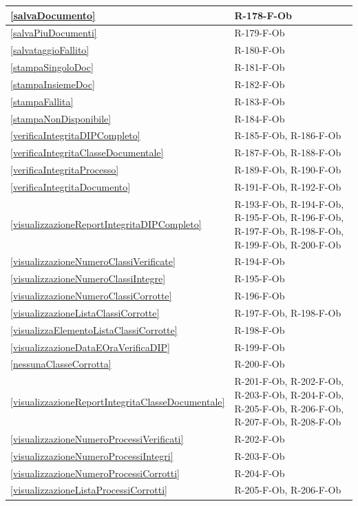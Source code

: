 \begin{longtable}{|p{4cm}|p{10cm}|}
\hline
\ref{salvaDocumento} & R-178-F-Ob \\
\hline
\ref{salvaPiuDocumenti} & R-179-F-Ob \\
\hline
\ref{salvataggioFallito} & R-180-F-Ob \\
\hline
\ref{stampaSingoloDoc} & R-181-F-Ob \\
\hline
\ref{stampaInsiemeDoc} & R-182-F-Ob \\
\hline
\ref{stampaFallita} & R-183-F-Ob \\
\hline
\ref{stampaNonDisponibile} & R-184-F-Ob \\
\hline
\ref{verificaIntegritaDIPCompleto} & R-185-F-Ob, R-186-F-Ob \\
\hline
\ref{verificaIntegritaClasseDocumentale} & R-187-F-Ob, R-188-F-Ob \\
\hline
\ref{verificaIntegritaProcesso} & R-189-F-Ob, R-190-F-Ob \\
\hline
\ref{verificaIntegritaDocumento} & R-191-F-Ob, R-192-F-Ob \\
\hline
\ref{visualizzazioneReportIntegritaDIPCompleto} & R-193-F-Ob, R-194-F-Ob, R-195-F-Ob, R-196-F-Ob, R-197-F-Ob, R-198-F-Ob, R-199-F-Ob, R-200-F-Ob \\
\hline
\ref{visualizzazioneNumeroClassiVerificate} & R-194-F-Ob \\
\hline
\ref{visualizzazioneNumeroClassiIntegre} & R-195-F-Ob \\
\hline
\ref{visualizzazioneNumeroClassiCorrotte} & R-196-F-Ob \\
\hline
\ref{visualizzazioneListaClassiCorrotte} & R-197-F-Ob, R-198-F-Ob \\
\hline
\ref{visualizzaElementoListaClassiCorrotte} & R-198-F-Ob \\
\hline
\ref{visualizzazioneDataEOraVerificaDIP} & R-199-F-Ob \\
\hline
\ref{nessunaClasseCorrotta} & R-200-F-Ob \\
\hline
\ref{visualizzazioneReportIntegritaClasseDocumentale} & R-201-F-Ob, R-202-F-Ob, R-203-F-Ob, R-204-F-Ob, R-205-F-Ob, R-206-F-Ob, R-207-F-Ob, R-208-F-Ob \\
\hline
\ref{visualizzazioneNumeroProcessiVerificati} & R-202-F-Ob \\
\hline
\ref{visualizzazioneNumeroProcessiIntegri} & R-203-F-Ob \\
\hline
\ref{visualizzazioneNumeroProcessiCorrotti} & R-204-F-Ob \\
\hline
\ref{visualizzazioneListaProcessiCorrotti} & R-205-F-Ob, R-206-F-Ob \\

\end{longtable}
